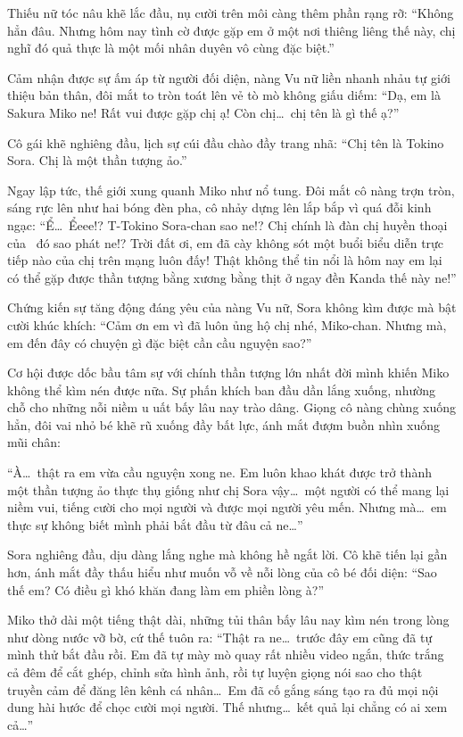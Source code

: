 \documentclass[../main.tex]{subfiles}
\begin{document}
Thiếu nữ tóc nâu khẽ lắc đầu, nụ cười trên môi càng thêm phần rạng rỡ: ``Không hẳn đâu. Nhưng hôm nay tình cờ được gặp em ở một nơi thiêng liêng thế này, chị nghĩ đó quả thực là một mối nhân duyên vô cùng đặc biệt.''

Cảm nhận được sự ấm áp từ người đối diện, nàng Vu nữ liền nhanh nhảu tự giới thiệu bản thân, đôi mắt to tròn toát lên vẻ tò mò không giấu diếm: ``Dạ, em là Sakura Miko ne! Rất vui được gặp chị ạ! Còn chị\dots\ chị tên là gì thế ạ?''

Cô gái khẽ nghiêng đầu, lịch sự cúi đầu chào đầy trang nhã: ``Chị tên là Tokino Sora. Chị là một thần tượng ảo.''

Ngay lập tức, thế giới xung quanh Miko như nổ tung. Đôi mắt cô nàng trợn tròn, sáng rực lên như hai bóng đèn pha, cô nhảy dựng lên lắp bắp vì quá đỗi kinh ngạc: ``Ể\dots\ Ểeee!? T-Tokino Sora-chan sao ne!? Chị chính là đàn chị huyền thoại của \hll\ đó sao phát ne!? Trời đất ơi, em đã cày không sót một buổi biểu diễn trực tiếp nào của chị trên mạng luôn đấy! Thật không thể tin nổi là hôm nay em lại có thể gặp được thần tượng bằng xương bằng thịt ở ngay đền Kanda thế này ne!''

Chứng kiến sự tăng động đáng yêu của nàng Vu nữ, Sora không kìm được mà bật cười khúc khích: ``Cảm ơn em vì đã luôn ủng hộ chị nhé, Miko-chan. Nhưng mà, em đến đây có chuyện gì đặc biệt cần cầu nguyện sao?''

Cơ hội được dốc bầu tâm sự với chính thần tượng lớn nhất đời mình khiến Miko không thể kìm nén được nữa. Sự phấn khích ban đầu dần lắng xuống, nhường chỗ cho những nỗi niềm u uất bấy lâu nay trào dâng. Giọng cô nàng chùng xuống hẳn, đôi vai nhỏ bé khẽ rũ xuống đầy bất lực, ánh mắt đượm buồn nhìn xuống mũi chân:

``À\dots\ thật ra em vừa cầu nguyện xong ne. Em luôn khao khát được trở thành một thần tượng ảo thực thụ giống như chị Sora vậy\dots\ một người có thể mang lại niềm vui, tiếng cười cho mọi người và được mọi người yêu mến. Nhưng mà\dots\ em thực sự không biết mình phải bắt đầu từ đâu cả ne\dots''

Sora nghiêng đầu, dịu dàng lắng nghe mà không hề ngắt lời. Cô khẽ tiến lại gần hơn, ánh mắt đầy thấu hiểu như muốn vỗ về nỗi lòng của cô bé đối diện: ``Sao thế em? Có điều gì khó khăn đang làm em phiền lòng à?''

Miko thở dài một tiếng thật dài, những tủi thân bấy lâu nay kìm nén trong lòng như dòng nước vỡ bờ, cứ thế tuôn ra: ``Thật ra ne\dots\ trước đây em cũng đã tự mình thử bắt đầu rồi. Em đã tự mày mò quay rất nhiều video ngắn, thức trắng cả đêm để cắt ghép, chỉnh sửa hình ảnh, rồi tự luyện giọng nói sao cho thật truyền cảm để đăng lên kênh cá nhân\dots\ Em đã cố gắng sáng tạo ra đủ mọi nội dung hài hước để chọc cười mọi người. Thế nhưng\dots\ kết quả lại chẳng có ai xem cả\dots''
\end{document}
